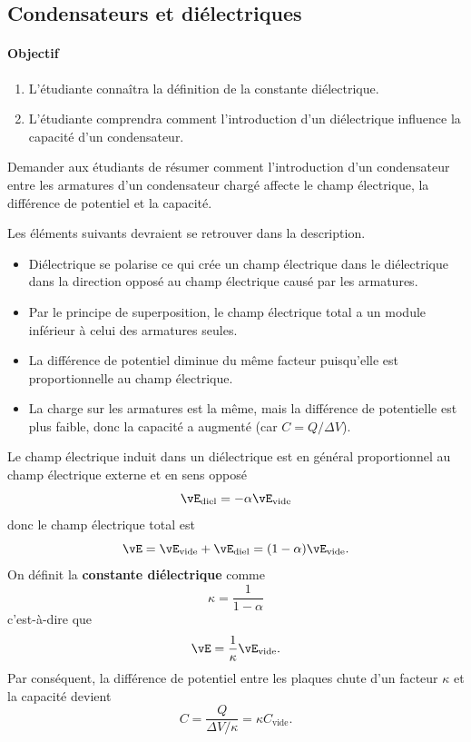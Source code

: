\subsection{Condensateurs et diélectriques}


\paragraph{Objectif}

\begin{enumerate}
  \item L'étudiante connaîtra la définition de la constante diélectrique.
  \item L'étudiante comprendra comment l'introduction d'un diélectrique
    influence la capacité d'un condensateur.
\end{enumerate}


Demander aux étudiants de résumer comment l'introduction d'un condensateur
entre les armatures d'un condensateur chargé affecte le champ électrique, la
différence de potentiel et la capacité.

Les éléments suivants devraient se retrouver dans la description.

\begin{itemize}
  \item Diélectrique se polarise ce qui crée un champ électrique dans le
    diélectrique dans la direction opposé au champ électrique causé par les
    armatures.
  \item Par le principe de superposition, le champ électrique total a un module
    inférieur à celui des armatures seules.
  \item La différence de potentiel diminue du même facteur puisqu'elle est
    proportionnelle au champ électrique.
  \item La charge sur les armatures est la même, mais la différence de
    potentielle est plus faible, donc la capacité a augmenté (car $C = Q/\Delta
    V$).
\end{itemize}




Le champ électrique induit dans un diélectrique est en général proportionnel au
champ électrique externe et en sens opposé
$$\vE_\text{diel} = -\alpha \vE_\text{vide}$$
donc le champ électrique total est
$$\vE = \vE_\text{vide} + \vE_\text{diel} = (1 - \alpha) \vE_\text{vide}.$$
On définit la \textbf{constante diélectrique} comme
$$\kappa = \frac{1}{1 - \alpha}$$
c'est-à-dire que
$$\vE = \frac{1}{\kappa} \vE_\text{vide}.$$
Par conséquent, la différence de potentiel entre les plaques chute d'un facteur
$\kappa$ et la capacité devient
$$C = \frac{Q}{\Delta V / \kappa} = \kappa C_\text{vide}.$$


